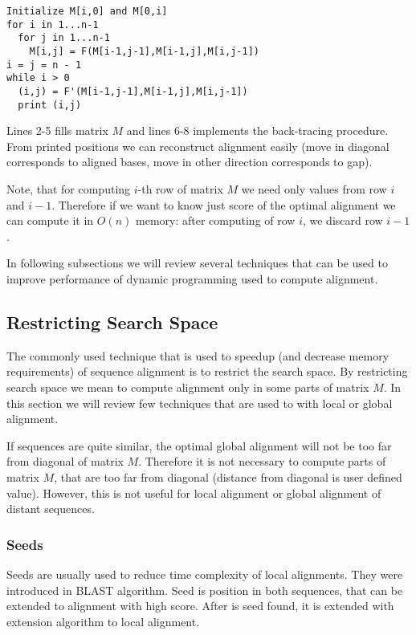 \begin{lstlisting}
Initialize M[i,0] and M[0,i]
for i in 1...n-1
  for j in 1...n-1
    M[i,j] = F(M[i-1,j-1],M[i-1,j],M[i,j-1])
i = j = n - 1
while i > 0
  (i,j) = F'(M[i-1,j-1],M[i-1,j],M[i,j-1])
  print (i,j)
\end{lstlisting}

Lines 2-5 fills matrix $M$ and lines 6-8 implements the back-tracing procedure.
From printed positions we can reconstruct alignment easily (move in diagonal
corresponds to aligned bases, move in other direction corresponds to gap).

Note, that for computing $i$-th row of matrix $M$ we need only values from row
$i$ and $i-1$. Therefore if we want to know just score of the optimal alignment
we can compute it in $O(n)$ memory: after computing of row $i$, we discard row
$i-1$.

In following subsections we will review several techniques that can be used to
improve performance of dynamic programming used to compute alignment.

\subsection{Restricting Search Space}

The commonly used technique that is used to speedup (and decrease memory
requirements) of sequence alignment is to restrict the search space. By
restricting search space we mean to compute alignment only in some parts of
matrix $M$. In this section we will review few techniques that are used to with
local or global alignment.

If sequences are quite similar, the optimal global alignment will not be too far
from diagonal of matrix $M$. Therefore it is not necessary to compute parts of
matrix $M$, that are too far from diagonal (distance from diagonal is user
defined value). However, this is not useful for local alignment or global
alignment of distant sequences.

\subsubsection{Seeds}

Seeds are usually used to reduce time complexity of local alignments.
They were introduced in BLAST algorithm\cite{}.  Seed is position in both
sequences, that can be extended to alignment with high score. After is seed
found, it is extended with extension algorithm to local alignment.


